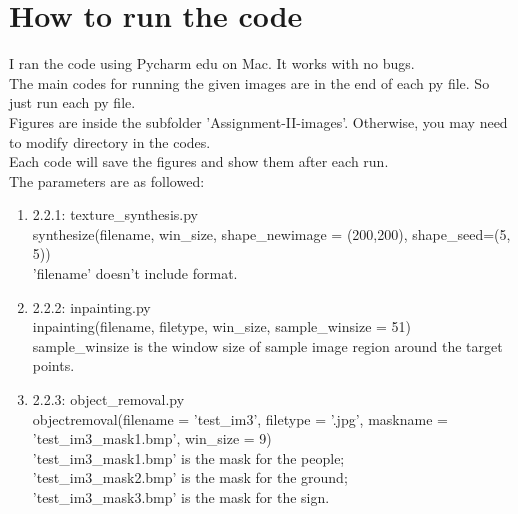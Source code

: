 \documentclass{extarticle}
\theoremstyle{definition}
\theoremstyle{definition}
\begin{document}
\pagebreak

\section{How to run the code}
I ran the code using Pycharm edu on Mac. It works with no bugs. \\
The main codes for running the given images are in the end of each py file. So just run each py file.\\
Figures are inside the subfolder 'Assignment-II-images'. Otherwise, you may need to modify directory in the codes.\\
Each code will save the figures and show them after each run.\\
The parameters are as followed:
\begin{enumerate}
	\item 2.2.1: texture\_synthesis.py	\\
		synthesize(filename, win\_size, shape\_newimage = (200,200), shape\_seed=(5, 5))\\
		'filename' doesn't include format.
	\item 2.2.2: inpainting.py\\
	inpainting(filename, filetype, win\_size, sample\_winsize = 51)\\
	sample\_winsize is the window size of sample image region around the target points.
	\item 2.2.3: object\_removal.py\\
	objectremoval(filename = 'test\_im3', filetype = '.jpg', maskname = 'test\_im3\_mask1.bmp', win\_size = 9)\\
	'test\_im3\_mask1.bmp' is the mask for the people;\\
	'test\_im3\_mask2.bmp' is the mask for the ground;\\
	'test\_im3\_mask3.bmp' is the mask for the sign.
\end{enumerate}
\end{document}
